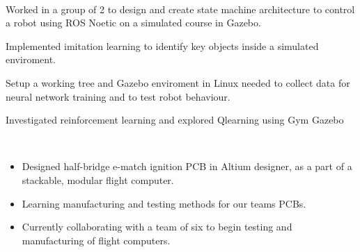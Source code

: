 \documentclass[a4paper]{MagicalCV}
\begin{document}
\begin{minipage}[t]{0.66\textwidth}
 \\
\begin{tightemize}
        \item Worked in a group of 2 to design and create state machine architecture to control a robot using ROS Noetic on a simulated course in Gazebo.
        \item Implemented imitation learning to identify key objects inside a simulated enviroment.
        \item Setup a working tree and Gazebo enviroment in Linux needed to collect data for neural network training and to test robot behaviour.
        \item Investigated reinforcement learning and explored Qlearning using Gym Gazebo
\end{tightemize}
\sectionsep

 \\
\begin{itemize}
    \item Designed half-bridge e-match ignition PCB in Altium designer, as a part of a stackable, modular flight computer.
    \item Learning manufacturing and testing methods for our teams PCBs.   
    \item Currently collaborating with a team of six to begin testing and manufacturing of flight computers.
\end{itemize} 
\sectionsep



\end{minipage} 
\end{document}
